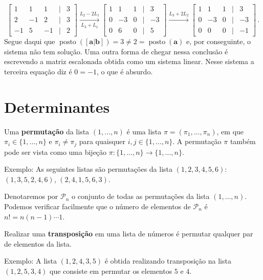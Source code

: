 \documentclass[12pt,a4paper]{report}
\newcommand{\tb}{\textbf}
\newcommand{\mb}{\mathbf}
\newcommand{\mc}{\mathcal}
\DeclareMathOperator{\posto}{posto}
\begin{document}
\begin{enumerate}
$$\begin{bmatrix}
    1&1&1&|&3\\
    2&-1&2&|&3\\
    -1&5&-1&|&2
  \end{bmatrix}\xrightarrow[L_3+L_1]{L_2-2L_1} \begin{bmatrix}
    1&1&1&|&3\\
    0&-3&0&|&-3\\
    0&6&0&|&5
  \end{bmatrix}\xrightarrow{L_3+2L_2} \begin{bmatrix}
    1&1&1&|&3\\
    0&-3&0&|&-3\\
    0&0&0&|&-1
  \end{bmatrix}\,.$$
  Segue daqui que $\posto([\mb a|\mb b])=3\ne 2=\posto(\mb a)$ e, por conseguinte, o sistema não tem solução. Uma outra forma de chegar nessa conclusão é escrevendo a matriz escalonada obtida como um sistema linear. Nesse sistema a terceira equação diz é $0=-1$, o que é absurdo.
\end{enumerate}

\chapter{Determinantes}

Uma \tb{permutação} da lista $(1,\ldots,n)$ é uma lista $\pi=(\pi_1,\ldots,\pi_n)$, em que $\pi_i\in\{1,\ldots,n\}$ e $\pi_{i}\ne \pi_j$ para quaisquer $i,j\in\{1,\ldots,n\}$. A permutação $\pi$ também pode ser vista como uma bijeção $\pi:\{1,\ldots,n\}\to\{1,\ldots,n\}$.

Exemplo: As seguintes listas são permutações da lista $(1,2,3,4,5,6)$: $(1,3,5,2,4,6)$, $(2,4,1,5,6,3)$.

Denotaremos por $\mc P_n$ o conjunto de todas as permutações da lista $(1,\ldots,n)$. Podemos verificar facilmente que o número de elementos de $\mc P_n$ é $n!=n(n-1)\cdots 1$.

Realizar uma \tb{transposição} em uma lista de números é permutar qualquer par de elementos da lista.

Exemplo: A lista $(1,2,4,3,5)$ é obtida realizando transposição na lista $(1,2,5,3,4)$ que consiste em permutar os elementos $5$ e $4$.
\end{document}

